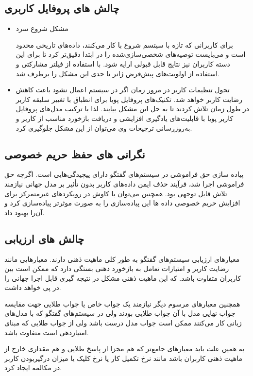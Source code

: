 \subsection{چالش های پروفایل کاربری}
\begin{itemize}
\item
مشکل شروع سرد

برای کاربرانی که تازه با سیتسم شروع با کار می‌کنند، داده‌های تاریخی محدود است و می‌بایست توصیه‌های شخصی‌سازی‌شده را در ابتدا دقیق‌تر کرد تا برای این دسته کاربران نیز نتایج قابل قبولی ارایه شود. با استفاده از فیلتر مشارکتی و استفاده از اولویت‌های پیش‌فرض ژانر تا حدی این مشکل را برطرف شد.

\item
تحول تنظیمات کاربر در مرور زمان اگر در سیستم اعمال نشود باعث کاهش رضایت کاربر خواهد شد. تکنیک‌های پروفایل پویا برای انطباق با تغییر سلیقه کاربر در طول زمان تلاش کردند تا به حل این مشکل بیایند. لذا با ترکیب مدل‌های پروفایل کاربر پویا با قابلیت‌های یادگیری افزایشی و دریافت بازخورد مناسب از کاربر و به‌روزرسانی ترجیحات وی می‌توان از این مشکل جلوگیری کرد.
\end{itemize}

\subsection{نگرانی های حفظ حریم خصوصی}
پیاده سازی حق فراموشی در سیستم‌‌های گفتگو دارای پیچیدگی‌هایی است. اگرچه حق فراموشی اجرا شد، فرآیند حذف ایمن داده‌های کاربر بدون تأثیر بر مدل جهانی نیازمند تلاش قابل توجهی بود. همچنین می‌توان با کاوش در رویکردهای غیرمتمرکز برای افزایش حریم خصوصی داده ها این پیاده‌سازی را به صورت موثرتر پیاده‌سازی کرد و آن‌را بهبود داد.


\subsection{چالش های ارزیابی}
معیارهای ارزیابی سیستم‌های گفتگو به طور کلی ماهیت ذهنی دارند. معیارهایی مانند رضایت کاربر و امتیازات تعامل به بازخورد ذهنی بستگی دارد که ممکن است بین کاربران متفاوت باشد. که این ماهیت ذهنی مشکل در نتیجه گیری قابل اجرا جهانی را در پی خواهد داشت.

همچنین معیارهای مرسوم دیگر نیازمند یک جواب خاص یا جواب طلایی جهت مقایسه جواب نهایی مدل با آن جواب طلایی بودند ولی در سیستم‌های گفتگو که با مدل‌های زبانی کار می‌کنند ممکن است جواب مدل درست باشد ولی از جواب طلایی که مبنای امتیازدهی است متفاوت باشد.

به همین علت باید معیارهای جامع‌تر که هم مجزا از پاسخ طلایی و هم مقداری خارج از ماهیت ذهنی کاربران باشد مانند نرخ تکمیل کار یا نرخ کلیک یا میزان درگیربودن کاربر در مکالمه ایجاد کرد.

